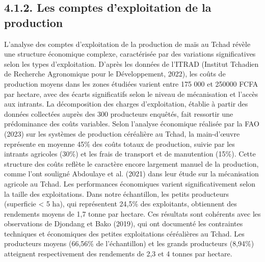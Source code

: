 \documentclass[12pt,oneside]{report}
\begin{document}
\subsection{4.1.2. Les comptes d’exploitation de la production}
L'analyse des comptes d'exploitation de la production de maïs au Tchad révèle une structure économique complexe, caractérisée par des variations significatives selon les types d'exploitation. D'après les données de l'ITRAD (Institut Tchadien de Recherche Agronomique pour le Développement, 2022), les coûts de production moyens dans les zones étudiées varient entre 175 000 et 250000 FCFA par hectare, avec des écarts significatifs selon le niveau de mécanisation et l'accès aux intrants. La décomposition des charges d'exploitation, établie à partir des données collectées auprès des 300 producteurs enquêtés, fait ressortir une prédominance des coûts variables. Selon l'analyse économique réalisée par la FAO (2023) sur les systèmes de production céréalière au Tchad, la main-d'œuvre représente en moyenne 45\% des coûts totaux de production, suivie par les intrants agricoles (30\%) et les frais de transport et de manutention (15\%). Cette structure des coûts reflète le caractère encore largement manuel de la production, comme l'ont souligné Abdoulaye et al. (2021) dans leur étude sur la mécanisation agricole au Tchad. Les performances économiques varient significativement selon la taille des exploitations. Dans notre échantillon, les petits producteurs (superficie < 5 ha), qui représentent 24,5\% des exploitants, obtiennent des rendements moyens de 1,7 tonne par hectare. Ces résultats sont cohérents avec les observations de Djondang et Bako (2019), qui ont documenté les contraintes techniques et économiques des petites exploitations céréalières au Tchad. Les producteurs moyens (66,56\% de l'échantillon) et les grands producteurs (8,94\%) atteignent respectivement des rendements de 2,3 et 4 tonnes par hectare.
\end{document}

